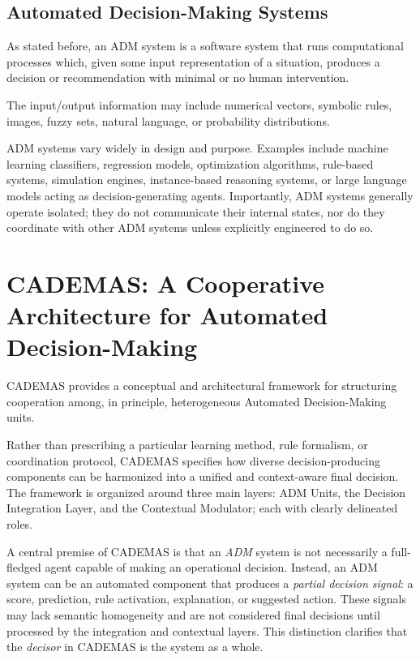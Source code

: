 \documentclass[letterpaper, 10 pt,conference]{IEEEconf}
\begin{document}
\subsection{Automated Decision-Making Systems}

As stated before, an ADM system is a software system that runs computational processes which, given some input representation of a situation, produces a decision or recommendation with minimal or no human intervention. 



The input/output information may include numerical vectors, symbolic rules, images, fuzzy sets, natural language, or probability distributions.

ADM systems vary widely in design and purpose. Examples include machine learning classifiers, regression models, optimization algorithms, rule-based systems, simulation engines, instance-based reasoning systems, or large language models acting as decision-generating agents. Importantly, ADM systems generally operate isolated; they do not communicate their internal states, nor do they coordinate with other ADM systems unless explicitly engineered to do so.

\section{CADEMAS: A Cooperative Architecture for Automated Decision-Making\label{sect:framework}}

CADEMAS provides a conceptual and architectural framework for structuring cooperation among, in principle, heterogeneous Automated Decision-Making units.

Rather than prescribing a particular learning method, rule formalism, or 
coordination protocol, CADEMAS specifies how diverse decision-producing 
components can be harmonized into a unified and context-aware final decision. 
The framework is organized around three main layers: ADM Units, the Decision 
Integration Layer, and the Contextual Modulator; each with clearly delineated 
roles.

A central premise of CADEMAS is that an \emph{ADM} system is not necessarily a 
full-fledged agent capable of making an operational decision. Instead, an ADM system can be an automated component that produces a \emph{partial decision signal}: a score, prediction, rule activation, explanation, or suggested action. These
signals may lack semantic homogeneity and are not considered final decisions
until processed by the integration and contextual layers. This distinction 
clarifies that the \emph{decisor} in CADEMAS is the system as a whole.
\end{document}
